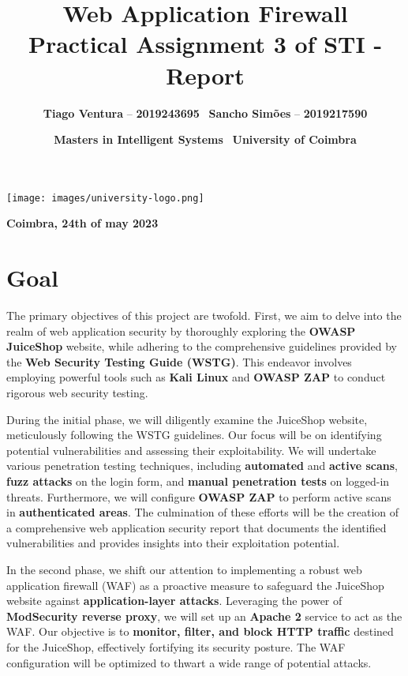 \documentclass[12pt]{article}
\title{\textbf{\huge Web Application Firewall\\ \large Practical Assignment 3 of STI - Report}}
\author{\textbf{\small Tiago Ventura} -- \textbf{\small 2019243695} \ \textbf{\small Sancho Simões} -- \textbf{\small 2019217590}}
\date{\textbf{\small Masters in Intelligent Systems} \ \textbf{\small University of Coimbra}}
\begin{document}
\maketitle

\vspace{1cm}

\begin{center}
\texttt{[image: images/university-logo.png]}
\end{center}

\begin{center}
\textbf{\large Coimbra, 24th of may 2023}
\end{center}

\newpage

\tableofcontents

\newpage

\section{Goal}

The primary objectives of this project are twofold. First, we aim to delve into the realm of web application security by thoroughly exploring the \textbf{OWASP JuiceShop} website, while adhering to the comprehensive guidelines provided by the \textbf{Web Security Testing Guide (WSTG)}. This endeavor involves employing powerful tools such as \textbf{Kali Linux} and \textbf{OWASP ZAP} to conduct rigorous web security testing.

During the initial phase, we will diligently examine the JuiceShop website, meticulously following the WSTG guidelines. Our focus will be on identifying potential vulnerabilities and assessing their exploitability. We will undertake various penetration testing techniques, including \textbf{automated} and \textbf{active scans}, \textbf{fuzz attacks} on the login form, and \textbf{manual penetration tests} on logged-in threats. Furthermore, we will configure \textbf{OWASP ZAP} to perform active scans in \textbf{authenticated areas}. The culmination of these efforts will be the creation of a comprehensive web application security report that documents the identified vulnerabilities and provides insights into their exploitation potential.

In the second phase, we shift our attention to implementing a robust web application firewall (WAF) as a proactive measure to safeguard the JuiceShop website against \textbf{application-layer attacks}. Leveraging the power of \textbf{ModSecurity reverse proxy}, we will set up an \textbf{Apache 2} service to act as the WAF. Our objective is to \textbf{monitor, filter, and block HTTP traffic} destined for the JuiceShop, effectively fortifying its security posture. The WAF configuration will be optimized to thwart a wide range of potential attacks.
\end{document}
